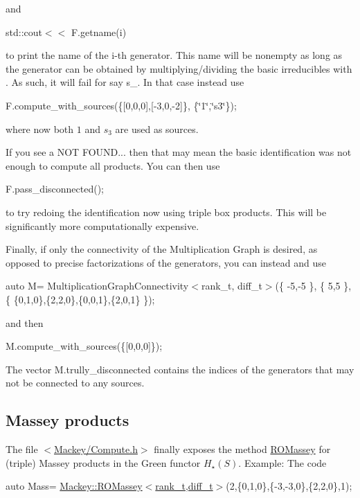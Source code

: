 and

{\ttfamily std\+::cout$<$$<$ F.\+getname(i) }

to print the name of the {\ttfamily i}-\/th generator. This name will be nonempty as long as the generator can be obtained by multiplying/dividing the basic irreducibles with {}. As such, it will fail for say {\ttfamily s\+\_}. In that case instead use

{\ttfamily F.\+compute\+\_\+with\+\_\+sources(\{\mbox{[}0,0,0\mbox{]},\mbox{[}-\/3,0,-\/2\mbox{]}\}, \{\char`\"{}1\char`\"{},\char`\"{}s3\char`\"{}\});}

where now both $1$ and $s_3$ are used as sources.

If you see a {\ttfamily N\+OT F\+O\+U\+ND...} then that may mean the basic identification was not enough to compute all products. You can then use

{\ttfamily F.\+pass\+\_\+disconnected();}

to try redoing the identification now using triple box products. This will be significantly more computationally expensive.

Finally, if only the connectivity of the Multiplication Graph is desired, as opposed to precise factorizations of the generators, you can instead and use

{\ttfamily auto M= Multiplication\+Graph\+Connectivity$<$rank\+\_\+t, diff\+\_\+t$>$(\{ -\/5,-\/5 \}, \{ 5,5 \}, \{ \{0,1,0\},\{2,2,0\},\{0,0,1\},\{2,0,1\} \});}

and then

{\ttfamily M.\+compute\+\_\+with\+\_\+sources(\{\mbox{[}0,0,0\mbox{]}\});}

The vector {\ttfamily M.\+trully\+\_\+disconnected} contains the indices of the generators that may not be connected to any sources. \hypertarget{use_step1Mass}{}\subsection{Massey products}\label{use_step1Mass}
The file {\ttfamily $<$\hyperlink{Compute_8h}{Mackey/\+Compute.\+h}$>$} finally exposes the method \hyperlink{namespaceMackey_a9fcefe47f5a8a416b173517377a61bd0}{R\+O\+Massey} for (triple) Massey products in the Green functor $H_{\star}(S)$. Example\+: The code

{\ttfamily auto Mass= \hyperlink{namespaceMackey_a9fcefe47f5a8a416b173517377a61bd0}{Mackey\+::\+R\+O\+Massey$<$rank\+\_\+t,diff\+\_\+t$>$}(2,\{0,1,0\},\{-\/3,-\/3,0\},\{2,2,0\},1);}

